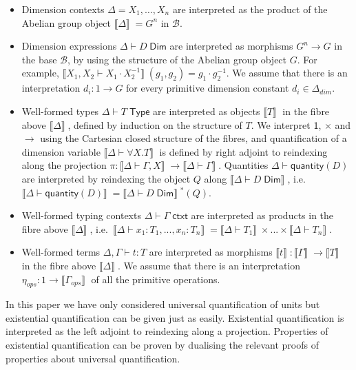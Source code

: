 \documentclass[a4paper,UKenglish]{lipics}
\newcommand{\ra}{\rightarrow}
\newcommand{\msf}[1]{\mathsf{#1}} %
\newcommand{\B}{\mathcal{B}}
\newcommand{\sem}[1]{\ensuremath{\llbracket #1 \rrbracket} \;}
\newcommand{\unitTy}{\msf{1}}
\newcommand{\qnt}{\msf{quantity}}
\newcommand{\Deltadim}{\ensuremath{\Delta_{dim}}}
\newcommand{\Gammaops}{\ensuremath{\Gamma_{ops}}}
\newcommand{\etaops}{\ensuremath{\eta_{ops}}}
\newcommand{\Dj}[2]{#1 \vdash #2 \; \msf{ Dim}}
\begin{document}
\begin{itemize}
\item Dimension contexts $\Delta = X_1, \ldots, X_n$ are interpreted as the product of the Abelian group object $\sem{\Delta} = G^n$ in $\B$.
\item Dimension expressions $\Dj \Delta D$ are interpreted as morphisms $G^n \ra G$ in the base $\B$, by using the structure of the Abelian group object $G$. For example, $\sem{X_1, X_2 \vdash X_1 \cdot X_2^{-1}}(g_1,g_2) = g_1 \cdot g_2^{-1}$. We assume that there is an interpretation $d_i : 1 \to G$ for every primitive dimension constant $d_i \in \Deltadim$.

\item Well-formed types $\Delta \vdash T \; \msf{ Type}$ are interpreted as objects $\sem{T}$ in the fibre above $\sem{\Delta}$,  defined by induction on the structure of $T$. We interpret $\unitTy$, $\times$ and $\rightarrow$ using the Cartesian closed structure of the fibres, and quantification of a dimension variable $\sem{\Delta \vdash \forall X. T}$ is defined by right adjoint to reindexing along the projection $\pi: \sem{\Delta \vdash \Gamma, X} \rightarrow \sem{\Delta \vdash \Gamma}$. Quantities $\Delta \vdash \qnt(D)$ are interpreted by reindexing the object $Q$ along $\sem{\Dj \Delta D}$, i.e. $\sem{\Delta \vdash \qnt(D)} = \sem{\Dj \Delta D}^\ast (Q)$.

\item Well-formed typing contexts $\Delta \vdash \Gamma \; \msf{ ctxt}$ are interpreted as products in the fibre above $\sem{\Delta}$, i.e.\ $\sem{\Delta \vdash x_1 : T_1 ,..., x_n:T_n} = \sem{\Delta \vdash T_1} \times ... \times \sem{\Delta \vdash T_n}$.

\item Well-formed terms $\Delta, \Gamma \vdash t : T$ are interpreted as morphisms $\sem{t} : \sem{\Gamma} \ra \sem{T}$ in the fibre above $\sem{\Delta}$. We assume that there is an interpretation $\etaops : 1 \to \sem{\Gammaops}$ of all the primitive operations.
\end{itemize}

In this paper we have only considered universal quantification of units but existential quantification can be given just as easily. Existential quantification is interpreted as the left adjoint to reindexing along a projection. Properties of  existential quantification can be proven by dualising the relevant proofs of properties about universal quantification.


\end{document}
